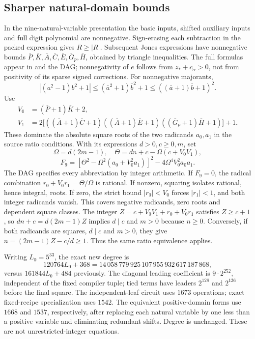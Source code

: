 \documentclass[11pt]{article}
\newcommand{\file}[1]{\texttt{\detokenize{#1}}}
\begin{document}
\subsection{Sharper natural-domain bounds}
In the nine-natural-variable presentation the basic inputs, shifted auxiliary
inputs and full digit polynomial are nonnegative. Sign-erasing each subtraction
in the packed expression gives $\overline R\ge|R|$. Subsequent Jones expressions
have nonnegative bounds $\overline P,\overline K,\overline A,\overline C,
\overline E,\overline G_p,\overline H$, obtained by triangle inequalities.
The full formulas appear in \file{nine/IMPROVEMENT_PROOF.md} and the DAG;
nonnegativity of $e$ follows from $z_*+c_\alpha>0$, not from positivity of
its sparse signed corrections. For nonnegative majorants,
\[
 |(a^2-1)b^2+1|\le(\bar a^2+1)\bar b^2+1
 \le((\bar a+1)\bar b+1)^2.
\]
Use
\begin{align*}
 V_0&=(\overline P+1)\overline K+2,\\
 V_1&=2\bigl[((\overline A+1)\overline C+1)
 ((\overline A+1)\overline E+1)
 ((\overline G_p+1)\overline H+1)\bigr]+1.
\end{align*}
These dominate the absolute square roots of the two radicands $a_0,a_1$
in the source ratio conditions. With its expressions $d>0,c\ge0,m$, set
\[
 \Omega=d(2m-1),\quad
 \Theta=dn+c-\Omega(c+V_0V_1),
\]
\[
 F_9=[\Theta^2-\Omega^2(a_0+V_0^2a_1)]^2
       -4\Omega^4V_0^2a_0a_1.
\tag{6}
\]
The DAG specifies every abbreviation by integer arithmetic. If $F_9=0$,
the radical combination $r_0+V_0r_1=\Theta/\Omega$ is rational. If nonzero,
squaring isolates rational, hence integral, roots. If zero, the strict
bound $|r_0|<V_0$ forces $|r_1|<1$, and both integer radicands vanish.
This covers negative radicands, zero roots and dependent square classes.
The integer $Z=c+V_0V_1+r_0+V_0r_1$ satisfies $Z\ge c+1$, so
$dn+c=d(2m-1)Z$ implies $d\mid c$ and $m>0$ because $n\ge0$.
Conversely, if both radicands are squares, $d\mid c$ and $m>0$, they give $n=(2m-1)Z-c/d\ge1$.
Thus the same ratio equivalence applies.

Writing $L_0=5^{33}$, the exact new degree is
\[
 120764L_0+368
 =14\,058\,779\,925\,107\,955\,932\,617\,187\,868,
\]
versus $161844L_0+484$ previously. The diagonal leading coefficient is
$9\cdot2^{252}$, independent of the fixed compiler tuple; tied terms have
leaders $2^{128}$ and $2^{126}$ before the final square. The independent-leaf
circuit uses $1673$ operations; exact fixed-recipe specialization uses $1542$.
The equivalent positive-domain forms use $1668$ and $1537$, respectively,
after replacing each natural variable by one less than a positive variable
and eliminating redundant shifts. Degree is unchanged. These are not
unrestricted-integer equations.
\end{document}
